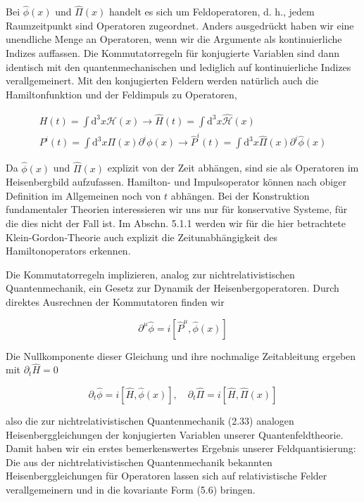 \documentclass[10pt, letterpaper]{article}
\begin{document}
Bei $\hat{\phi}(x)$ und $\hat{\Pi}(x)$ handelt es sich um Feldoperatoren, d. h., jedem Raumzeitpunkt sind Operatoren zugeordnet. Anders ausgedrückt haben wir eine unendliche Menge an Operatoren, wenn wir die Argumente als kontinuierliche Indizes auffassen. Die Kommutatorregeln für konjugierte Variablen sind dann identisch mit den quantenmechanischen und lediglich auf kontinuierliche Indizes verallgemeinert. Mit den konjugierten Feldern werden natürlich auch die Hamiltonfunktion und der Feldimpuls zu Operatoren,

$$
\begin{gathered}
H(t)=\int \mathrm{d}^{3} x \mathscr{H}(x) \rightarrow \hat{H}(t)=\int \mathrm{d}^{3} x \hat{\mathscr{H}}(x) \\
P^{i}(t)=\int \mathrm{d}^{3} x \Pi(x) \partial^{i} \phi(x) \rightarrow \hat{P}^{i}(t)=\int \mathrm{d}^{3} x \hat{\Pi}(x) \partial^{i} \hat{\phi}(x)
\end{gathered}
$$

Da $\hat{\phi}(x)$ und $\hat{\Pi}(x)$ explizit von der Zeit abhängen, sind sie als Operatoren im Heisenbergbild aufzufassen. Hamilton- und Impulsoperator können nach obiger Definition im Allgemeinen noch von $t$ abhängen. Bei der Konstruktion fundamentaler Theorien interessieren wir uns nur für konservative Systeme, für die dies nicht der Fall ist. Im Abschn. 5.1.1 werden wir für die hier betrachtete Klein-Gordon-Theorie auch explizit die Zeitunabhängigkeit des Hamiltonoperators erkennen.

Die Kommutatorregeln implizieren, analog zur nichtrelativistischen Quantenmechanik, ein Gesetz zur Dynamik der Heisenbergoperatoren. Durch direktes Ausrechnen der Kommutatoren finden wir

$$
\partial^{\mu} \hat{\phi}=i\left[\hat{P}^{\mu}, \hat{\phi}(x)\right]
$$

Die Nullkomponente dieser Gleichung und ihre nochmalige Zeitableitung ergeben mit $\partial_{t} \hat{H}=0$

$$
\partial_{t} \hat{\phi}=i[\hat{H}, \hat{\phi}(x)], \quad \partial_{t} \hat{\Pi}=i[\hat{H}, \hat{\Pi}(x)]
$$

also die zur nichtrelativistischen Quantenmechanik (2.33) analogen Heisenberggleichungen der konjugierten Variablen unserer Quantenfeldtheorie. Damit haben wir ein erstes bemerkenswertes Ergebnis unserer Feldquantisierung: Die aus der nichtrelativistischen Quantenmechanik bekannten Heisenberggleichungen für Operatoren lassen sich auf relativistische Felder verallgemeinern und in die kovariante Form (5.6) bringen.
\end{document}

